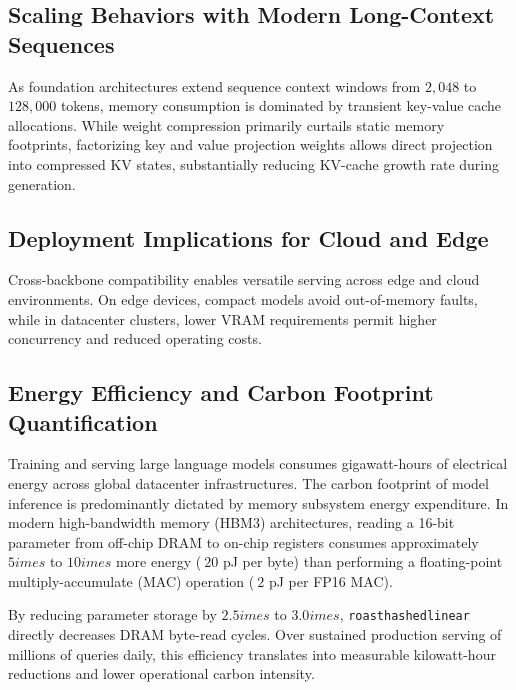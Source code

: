 \subsection{Scaling Behaviors with Modern Long-Context Sequences}
As foundation architectures extend sequence context windows from $2{,}048$ to $128{,}000$ tokens, memory consumption is dominated by transient key-value cache allocations. While weight compression primarily curtails static memory footprints, factorizing key and value projection weights allows direct projection into compressed KV states, substantially reducing KV-cache growth rate during generation.

\subsection{Deployment Implications for Cloud and Edge}
Cross-backbone compatibility enables versatile serving across edge and cloud environments. On edge devices, compact models avoid out-of-memory faults, while in datacenter clusters, lower VRAM requirements permit higher concurrency and reduced operating costs.

\subsection{Energy Efficiency and Carbon Footprint Quantification}
Training and serving large language models consumes gigawatt-hours of electrical energy across global datacenter infrastructures. The carbon footprint of model inference is predominantly dictated by memory subsystem energy expenditure. In modern high-bandwidth memory (HBM3) architectures, reading a 16-bit parameter from off-chip DRAM to on-chip registers consumes approximately $5	imes$ to $10	imes$ more energy ($~20$ pJ per byte) than performing a floating-point multiply-accumulate (MAC) operation ($~2$ pJ per FP16 MAC).

By reducing parameter storage by $2.5	imes$ to $3.0	imes$, \texttt{roasthashedlinear} directly decreases DRAM byte-read cycles. Over sustained production serving of millions of queries daily, this efficiency translates into measurable kilowatt-hour reductions and lower operational carbon intensity.
